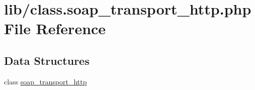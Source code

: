 \hypertarget{class_8soap__transport__http_8php}{}\section{lib/class.soap\+\_\+transport\+\_\+http.\+php File Reference}
\label{class_8soap__transport__http_8php}
\subsection*{Data Structures}
\begin{DoxyCompactItemize}
\item 
class \hyperlink{classsoap__transport__http}{soap\+\_\+transport\+\_\+http}
\end{DoxyCompactItemize}

